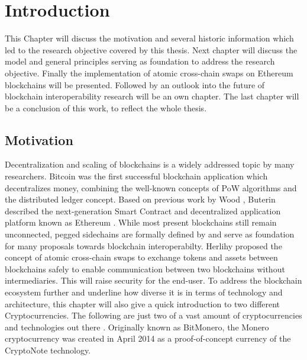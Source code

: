 %
%
\chapter{Introduction}
\label{ch:intro}
This Chapter will discuss the motivation and several historic information which led to the research objective covered by this thesis. Next chapter will discuss the model and general principles serving as foundation to address the research objective. Finally the implementation of atomic cross-chain swaps on Ethereum blockchains will be presented. Followed by an outlook into the future of blockchain interoperability research will be an own chapter.
The last chapter will be a conclusion of this work, to reflect the whole thesis.


%
%
\section{Motivation}
\label{sec:intro:motivation}
Decentralization and scaling of blockchains is a widely addressed topic by
many researchers. Bitcoin \cite{nakamoto2008peer} was the first successful blockchain application
which decentralizes money, combining the well-known concepts of \ac{PoW} algorithms and the distributed ledger concept. Based on previous work
by Wood \cite{wood2014ethereum}, Buterin described the next-generation Smart Contract and decentralized
application platform known as Ethereum \cite{buterin2013ethereum} \cite{buterin2014ethereum}. While most present
blockchains still remain unconnected, pegged sidechains are formally defined
by \cite{back2014enabling} and serve as foundation for many proposals towards blockchain
interoperabilty. Herlihy proposed the concept of atomic cross-chain
swaps to exchange tokens and assets between blockchains safely \cite{herlihy2018atomic}
to enable communication between two blockchains without intermediaries. This will raise security for the end-user.
To address the blockchain ecosystem further and underline how diverse it is in terms of technology and architecture, this chapter will also give a quick introduction to two different Cryptocurrencies. The following are just two of a vast amount of cryptocurrencies and technologies out there .
Originally known as BitMonero, the Monero cryptocurrency was created in April 2014 \cite{alonso2020zero} as a proof-of-concept currency of the CryptoNote \cite{van2013cryptonote} technology.
